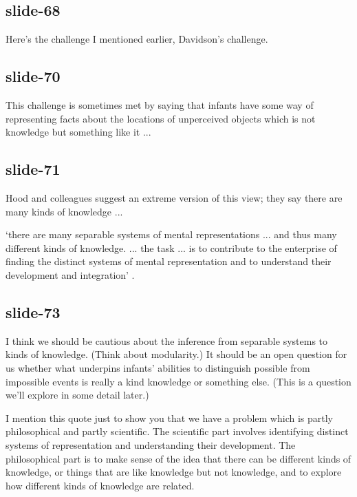 \documentclass[12pt,\papersize]{extarticle}
\begin{document}
 
 
\subsection{slide-68}
Here's the challenge I mentioned earlier, Davidson's challenge.
 
 
 
\subsection{slide-70}
This challenge is sometimes met by saying that infants have some way of representing facts about the locations of unperceived objects which is not knowledge but something like it ...
 
 
 
\subsection{slide-71}
Hood and colleagues suggest an extreme version of this view; they say there are many kinds of knowledge ...
 
‘there are many separable systems of mental representations ... and thus many different kinds of knowledge. ... the task ... is to contribute to the enterprise of finding the distinct systems of mental representation and to understand their development and integration’
\citep[p.\ 1522]{Hood:2000bf}.
 
 
 
\subsection{slide-73}
I think we should be cautious about the inference from separable systems to kinds of knowledge. (Think about modularity.) It should be an open question for us whether what underpins infants' abilities to distinguish possible from impossible events is really a kind knowledge or something else. (This is a question we'll explore in some detail later.)
 
I mention this quote just to show you that we have a problem which is partly philosophical and partly scientific. The scientific part involves identifying distinct systems of representation and understanding their development. The philosophical part is to make sense of the idea that there can be different kinds of knowledge, or things that are like knowledge but not knowledge, and to explore how different kinds of knowledge are related.
 
\end{document}
